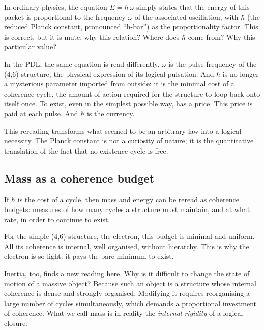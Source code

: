 \documentclass[11pt, a4paper, openright]{book}
\begin{document}
\medskip

In ordinary physics, the equation $E = \hbar\,\omega$ simply states that the energy of this packet is proportional to the frequency $\omega$ of the associated oscillation, with $\hbar$ (the reduced Planck constant, pronounced “h-bar”) as the proportionality factor. This is correct, but it is mute: why this relation? Where does $\hbar$ come from? Why this particular value?

\medskip

In the PDL, the same equation is read differently. $\omega$ is the pulse frequency of the (4,6) structure, the physical expression of its logical pulsation. And $\hbar$ is no longer a mysterious parameter imported from outside: it is the minimal cost of a coherence cycle, the amount of action required for the structure to loop back onto itself once. To exist, even in the simplest possible way, has a price. This price is paid at each pulse. And $\hbar$ is the currency.

\medskip

This rereading transforms what seemed to be an arbitrary law into a logical necessity. The Planck constant is not a curiosity of nature; it is the quantitative translation of the fact that no existence cycle is free.

\subsection*{Mass as a coherence budget}

If $\hbar$ is the cost of a cycle, then mass and energy can be reread as coherence budgets: measures of how many cycles a structure must maintain, and at what rate, in order to continue to exist.

\medskip

For the simple (4,6) structure, the electron, this budget is minimal and uniform. All its coherence is internal, well organised, without hierarchy. This is why the electron is so light: it pays the bare minimum to exist.

\medskip

Inertia, too, finds a new reading here. Why is it difficult to change the state of motion of a massive object? Because such an object is a structure whose internal coherence is dense and strongly organised. Modifying it requires reorganising a large number of cycles simultaneously, which demands a proportional investment of coherence. What we call mass is in reality the \emph{internal rigidity} of a logical closure.
\end{document}
